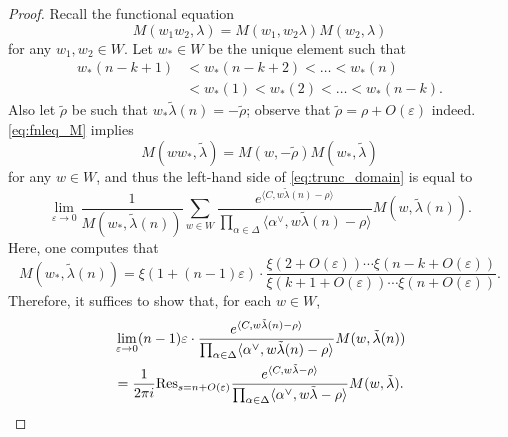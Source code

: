\documentclass[11pt]{amsart}
\numberwithin{theorem}{section}
\numberwithin{equation}{section}
\theoremstyle{remark}
\theoremstyle{definition}
\newcommand{\ga}{\mathfrak{a}}
\begin{document}
\begin{proof}
Recall the functional equation
\begin{equation} \label{eq:fnleq_M}
M(w_1w_2,\lambda) = M(w_1,w_2\lambda)M(w_2,\lambda)
\end{equation}
for any $w_1,w_2 \in W$.
Let $w_* \in W$ be the unique element such that
\begin{align*}
w_*(n-k+1) &< w_*(n-k+2) < \ldots < w_*(n) \\
&< w_*(1) < w_*(2) < \ldots < w_*(n-k).
\end{align*}
Also let $\tilde\rho$ be such that $w_*\tilde\lambda(n) = -\tilde\rho$; observe that $\tilde\rho = \rho + O(\varepsilon)$ indeed. \eqref{eq:fnleq_M} implies
\begin{equation*}
M(ww_*,\tilde\lambda) = M(w,-\tilde\rho)M(w_*,\tilde\lambda)
\end{equation*}
for any $w\in W$, and thus the left-hand side of \eqref{eq:trunc_domain} is equal to
\begin{equation*}
\lim_{\varepsilon\rightarrow0}\frac{1}{M(w_*,\tilde\lambda(n))}\sum_{w \in W} \frac{e^{\langle C, w\tilde\lambda(n)-\rho\rangle}}{\prod_{\alpha \in \Delta} \langle \alpha^\vee, w\tilde\lambda(n)-\rho \rangle}M(w,\tilde\lambda(n)).
\end{equation*}
Here, one computes that
\begin{equation*}
M(w_*,\tilde\lambda(n)) = \xi(1+(n-1)\varepsilon)\cdot \frac{\xi(2+O(\varepsilon)) \cdots \xi(n-k+O(\varepsilon))}{\xi(k+1+O(\varepsilon)) \cdots\xi(n+O(\varepsilon))}.
\end{equation*}
Therefore, it suffices to show that, for each $w \in W$,
\begin{align}\label{eq:chicken}
&\lim_{\varepsilon\rightarrow0} (n-1)\varepsilon\cdot\frac{e^{\langle C, w\tilde\lambda(n)-\rho\rangle}}{\prod_{\alpha \in \Delta} \langle \alpha^\vee, w\tilde\lambda(n)-\rho \rangle}M(w,\tilde\lambda(n)) \\
&= \frac{1}{2\pi i}\mathrm{Res}_{s=n+O(\varepsilon)}\frac{e^{\langle C, w\tilde\lambda-\rho\rangle}}{\prod_{\alpha \in \Delta} \langle \alpha^\vee, w\tilde\lambda-\rho \rangle}M(w,\tilde\lambda). \notag
\end{align}


\end{proof}
\end{document}
